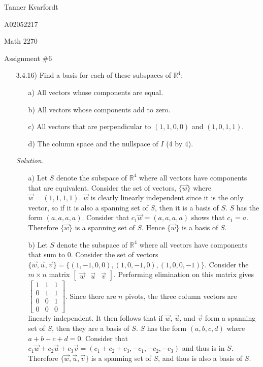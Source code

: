 \documentclass[12pt]{article}
\begin{document}
\hfill Tanner Kvarfordt

\hfill A02052217

\hfill Math 2270

\hfill Assignment \#6


\begin{itemize}
\item[3.4.16)] Find a basis for each of these subspaces of $\mathbb{R}^4$:
\begin{itemize}
\item[a)] All vectors whose components are equal.
\item[b)] All vectors whose components add to zero.
\item[c)] All vectors that are perpendicular to $(1,1,0,0)$ and $(1,0,1,1)$.
\item[d)] The column space and the nullspace of $I$ (4 by 4).
\end{itemize}

\textit{Solution.}
\begin{itemize}
\item[a)] Let $S$ denote the subspace of $\mathbb{R}^4$ where all vectors have components that are equivalent. Consider the set of vectors, $\{ \vec{w}\}$ where $\vec{w}=(1,1,1,1)$. $\vec{w}$ is clearly linearly independent since it is the only vector, so if it is also a spanning set of $S$, then it is a basis of $S$. $S$ has the form $(a,a,a,a)$. Consider that $c_1\vec{w}=(a,a,a,a)$ shows that $c_1=a$. Therefore $\{\vec{w}\}$ is a spanning set of $S$. Hence $\{\vec{w}\}$ is a basis of $S$.
\item[b)] Let $S$ denote the subspace of $\mathbb{R}^4$ where all vectors have components that sum to $0$. Consider the set of vectors $\{\vec{w}, \vec{u}, \vec{v}\} = \{(1,-1,0,0),(1,0,-1,0),(1,0,0,-1)\}$. Consider the $m \times n$ matrix
$\left[\begin{array}{ccc} \vec{w} & \vec{u} & \vec{v}\end{array}\right]$. Performing elimination on this matrix gives 
$\left[\begin{array}{ccc}
1 & 1 & 1\\ 
0 & 1 & 1\\
0 & 0 & 1\\
0 & 0 & 0
\end{array}\right]$. Since there are $n$ pivots, the three column vectors are linearly independent. It then follows that if $\vec{w}$, $\vec{u}$, and $\vec{v}$ form a spanning set of $S$, then they are a basis of $S$. $S$ has the form $(a,b,c,d)$ where $a+b+c+d=0$. Consider that $c_1\vec{w}+c_2\vec{u}+c_3\vec{v}=(c_1+c_2+c_3,-c_1,-c_2,-c_3)$ and thus is in $S$. Therefore $\{\vec{w}, \vec{u}, \vec{v}\}$ is a spanning set of $S$, and thus is also a basis of $S$.


\end{itemize}
\end{itemize}
\end{document}
